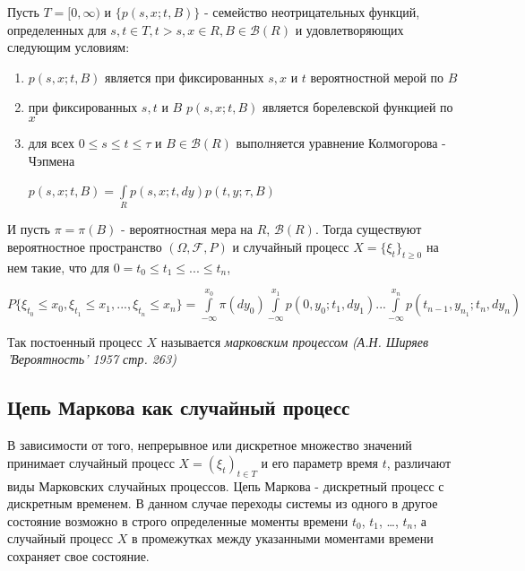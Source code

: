 \begin{corollary} Пусть $T = [0, \infty)$ и $\lbrace p(s, x; t, B)\rbrace$ - семейство неотрицательных функций, определенных для $s, t \in T, t > s, x \in R, B \in \mathscr{B}(R)$ и удовлетворяющих следующим условиям:
	\begin{enumerate}
	\item $p(s, x; t, B)$ является при фиксированных $s, x$ и $t$ вероятностной мерой по $B$
	\item при фиксированных $s, t$ и $B$  $p(s, x; t, B)$ является борелевской функцией по $x$
	\item для всех $0 \leq s \le t \le \tau$ и $B \in \mathscr{B}(R)$ выполняется уравнение Колмогорова - Чэпмена
	\begin{center}
	$p(s, x; t, B) = \int\limits_{R}^{ } p(s, x; t, dy)p(t, y; \tau, B)$
	\end{center}
	\end{enumerate}
	
	И пусть $\pi = \pi (B)$ - вероятностная мера на $R$, $\mathscr{B}(R)$. Тогда существуют вероятностное пространство $(\Omega , \mathscr{F}, P)$ и случайный процесс $X = \lbrace \xi_t \rbrace_{t \geq 0}$ на нем такие, что для $0 = t_0 \le t_1 \le ... \le t_n$, 
	\begin{center}
	$P \lbrace \xi_{t_0} \leq x_0, \xi_{t_1} \leq x_1, ..., \xi_{t_n} \leq x_n \rbrace = \int\limits_{-\infty}^{x_0} \pi (dy_{0}) \int\limits_{-\infty}^{x_1} p(0, y_0; t_1, dy_1) ... \int\limits_{-\infty}^{x_n} p(t_{n-1}, y_{n_1}; t_n, dy_n)$
	\end{center}
\end{corollary}

Так постоенный процесс $X$ называется \textit{марковским процессом} \textit{(А.Н. Ширяев 'Вероятность' 1957 стр. 263)} 

\subsection{Цепь Маркова как случайный процесс}
В зависимости от того, непрерывное или дискретное множество значений принимает случайный процесс $X = (\xi_{t})_{t \in T }$ и его параметр время $t$, различают виды Марковских случайных процессов. Цепь Маркова - дискретный процесс с дискретным временем. В данном случае переходы системы из одного в другое состояние возможно в строго определенные моменты времени $t_0$, $t_1$, …, $t_n$, а случайный процесс $X$ в промежутках между указанными моментами времени сохраняет свое состояние.

